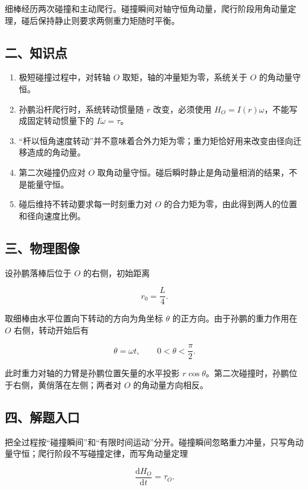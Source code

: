 \documentclass[12pt,a4paper,UTF8]{ctexart}
\newcommand{\tightlist}{\setlength{\itemsep}{0pt}\setlength{\parskip}{0pt}}
\begin{document}
细棒经历两次碰撞和主动爬行。碰撞瞬间对轴守恒角动量，爬行阶段用角动量定理，碰后保持静止则要求两侧重力矩随时平衡。

\subsection{二、知识点}\label{ux4e8cux77e5ux8bc6ux70b9}

\begin{enumerate}
\def\labelenumi{\arabic{enumi}.}
\tightlist
\item
  极短碰撞过程中，对转轴 \(O\) 取矩，轴的冲量矩为零，系统关于 \(O\)
  的角动量守恒。
\item
  孙鹏沿杆爬行时，系统转动惯量随 \(r\) 改变，必须使用
  \(H_O=I(r)\omega\)，不能写成固定转动惯量下的 \(I\dot\omega=\tau\)。
\item
  ``杆以恒角速度转动''并不意味着合外力矩为零；重力矩恰好用来改变由径向迁移造成的角动量。
\item
  第二次碰撞仍应对 \(O\)
  取角动量守恒。碰后瞬时静止是角动量相消的结果，不是能量守恒。
\item
  碰后维持不转动要求每一时刻重力对 \(O\)
  的合力矩为零，由此得到两人的位置和径向速度比例。
\end{enumerate}

\subsection{三、物理图像}\label{ux4e09ux7269ux7406ux56feux50cf}

设孙鹏落棒后位于 \(O\) 的右侧，初始距离

\[r_0=\frac L4.\]

取细棒由水平位置向下转动的方向为角坐标 \(\theta\)
的正方向。由于孙鹏的重力作用在 \(O\) 右侧，转动开始后有

\[\theta=\omega t,\qquad 0<\theta<\frac{\pi}{2}.\]

此时重力对轴的力臂是孙鹏位置矢量的水平投影
\(r\cos\theta\)。第二次碰撞时，孙鹏位于右侧，黄俏落在左侧；两者对 \(O\)
的角动量方向相反。

\subsection{四、解题入口}\label{ux56dbux89e3ux9898ux5165ux53e3}

把全过程按``碰撞瞬间''和``有限时间运动''分开。碰撞瞬间忽略重力冲量，只写角动量守恒；爬行阶段不写碰撞定律，而写角动量定理

\[\frac{\mathrm dH_O}{\mathrm dt}=\tau_O.\]
\end{document}
